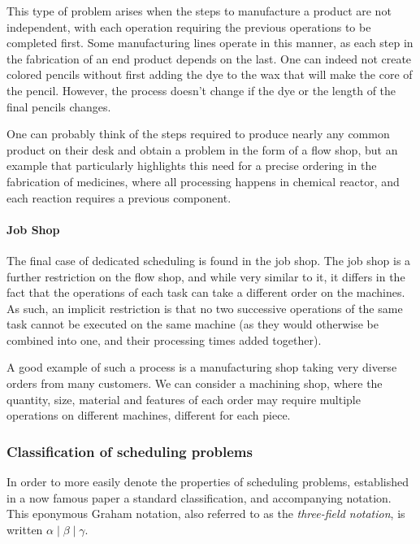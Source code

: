 \documentclass{mimosis}
\begin{document}
This type of problem arises when the steps to manufacture a product are not independent, with each operation requiring the previous operations to be completed first. Some manufacturing lines operate in this manner, as each step in the fabrication of an end product depends on the last. One can indeed not create colored pencils without first adding the dye to the wax that will make the core of the pencil. However, the process doesn't change if the dye or the length of the final pencils changes.

One can probably think of the steps required to produce nearly any common product on their desk and obtain a problem in the form of a flow shop, but an example that particularly highlights this need for a precise ordering in the fabrication of medicines, where all processing happens in chemical reactor, and each reaction requires a previous component.

\paragraph{Job Shop}

The final case of dedicated scheduling is found in the job shop. The job shop is a further restriction on the flow shop, and while very similar to it, it differs in the fact that the operations of each task can take a different order on the machines. As such, an implicit restriction is that no two successive operations of the same task cannot be executed on the same machine (as they would otherwise be combined into one, and their processing times added together).

A good example of such a process is a manufacturing shop taking very diverse orders from many customers. We can consider a machining shop, where the quantity, size, material and features of each order may require multiple operations on different machines, different for each piece.

\subsubsection{Classification of scheduling problems}

In order to more easily denote the properties of scheduling problems, \citeauthor{graham1979optimization} established in a now famous paper \citep{graham1979optimization} a standard classification, and accompanying notation. This eponymous Graham notation, also referred to as the \emph{three-field notation}, is written \(\alpha \mid \beta \mid \gamma\).
\end{document}
